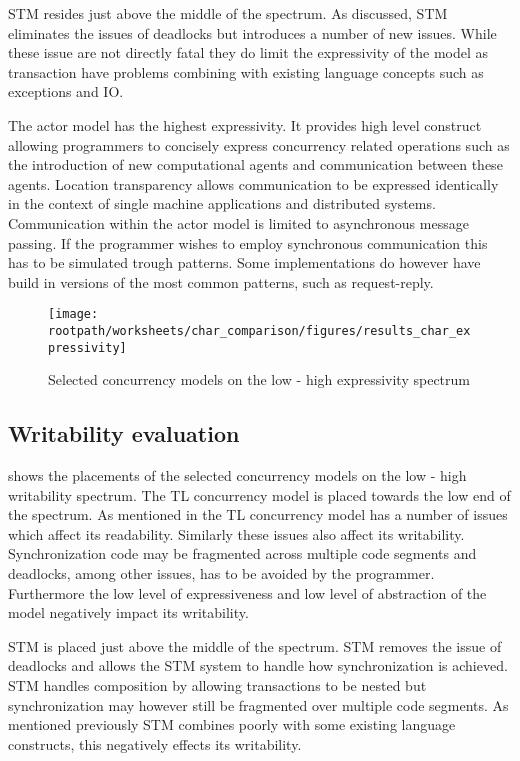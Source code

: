 \ac{STM} resides just above the middle of the spectrum. As discussed, \ac{STM} eliminates the issues of deadlocks but introduces a number of new issues. While these issue are not directly fatal they do limit the expressivity of the model as transaction have problems combining with existing language concepts such as exceptions and \ac{IO}.

The actor model has the highest expressivity. It provides high level construct allowing programmers to concisely express concurrency related operations such as the introduction of new computational agents and communication between these agents. Location transparency allows communication to be expressed identically in the context of single machine applications and distributed systems. Communication within the actor model is limited to asynchronous message passing. If the programmer wishes to employ synchronous communication this has to be simulated trough patterns. Some implementations do however have build in versions of the most common patterns, such as request-reply.

\begin{figure}[htbp]
\centering
 \texttt{[image: \\rootpath/worksheets/char\_comparison/figures/results\_char\_expressivity]} 
 \caption{Selected concurrency models on the low - high expressivity spectrum}
\label{fig:results_char_expressivity}
\end{figure}

\subsection{Writability evaluation}
 shows the placements of the selected concurrency models on the low - high writability spectrum. The \ac{TL} concurrency model is placed towards the low end of the spectrum. As mentioned in  the \ac{TL} concurrency model has a number of issues which affect its readability. Similarly these issues also affect its writability. Synchronization code may be fragmented across multiple code segments and deadlocks, among other issues, has to be avoided by the programmer. Furthermore the low level of expressiveness and low level of abstraction of the model negatively impact its writability.

\ac{STM} is placed just above the middle of the spectrum. \ac{STM} removes the issue of deadlocks and allows the \ac{STM} system to handle how synchronization is achieved. \ac{STM} handles composition by allowing transactions to be nested but synchronization may however still be fragmented over multiple code segments. As mentioned previously \ac{STM} combines poorly with some existing language constructs, this negatively effects its writability.

